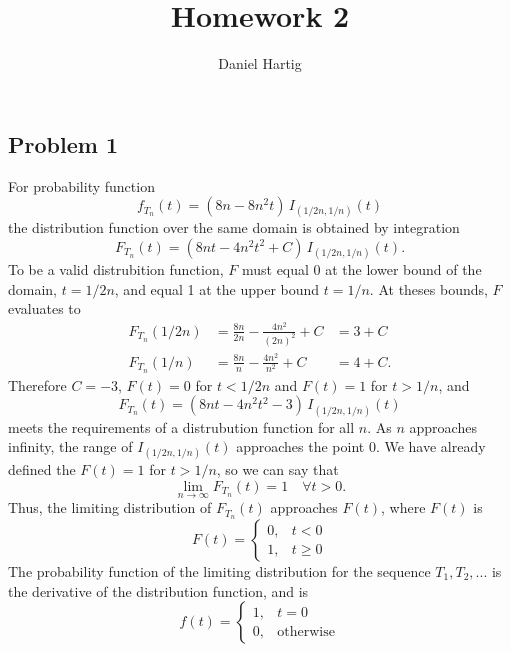 \documentclass{article}
\title{Homework 2}
\author{Daniel Hartig}
\begin{document}
\maketitle

\subsection*{Problem 1}

For probability function $$f_{T_n}(t) = (8n-8n^2t)\, I_{(1/2n, 1/n)}(t)$$ the distribution function over the same domain is obtained by integration $$F_{T_n}(t) = (8nt - 4n^2t^2 + C)\, I_{(1/2n, 1/n)}(t).$$ To be a valid distrubition function, $F$ must equal 0 at the lower bound of the domain, $t = 1/2n$, and equal 1 at the upper bound $t = 1/n$. At theses bounds, $F$ evaluates to 
\[\begin{aligned}
F_{T_n}(1/2n) &= \frac{8n}{2n} - \frac{4n^2}{(2n)^2} + C &= 3 + C \\
F_{T_n}(1/n)&= \frac{8n}{n} - \frac{4n^2}{n^2} + C &= 4 + C.
\end{aligned}\]
Therefore $C = -3$, $F(t) = 0$ for $ t<1/2n$ and $F(t) = 1$ for $ t > 1/n$, and \[F_{T_n}(t) = (8nt - 4n^2t^2 -3)\, I_{(1/2n, 1/n)}(t)\] meets the requirements of a distrubution function for all $n$. As $n$ approaches infinity, the range of $I_{(1/2n, 1/n)}(t)$ approaches the point $0$. We have already defined the $F(t) = 1$ for $ t > 1/n$, so we can say that \[\lim_{n\to\infty} F_{T_n}(t) = 1\quad \forall t > 0.\] Thus, the limiting distribution of $F_{T_n}(t)$ approaches $F(t)$, where $F(t)$ is 
\[F(t) = \begin{cases}
0, &t < 0 \\
1, &t \geq 0 \end{cases}\] The probability function of the limiting distribution for the sequence $T_1, T_2, ...$ is the derivative of the distribution function, and is 
\[f(t) = \begin{cases}
1, &t = 0 \\
0, &\text{otherwise}
\end{cases}\]

\iffalse
As $n\to\infty$, the mass function \[f_{T_n}(t) = (8n-8n^2t)\, I_{(1/2n, 1/n)}(t)\] approaches different values in its upper and lower bounds in $t$. At $t = 1/n$, \[\lim_{n\to\infty} (8n-8n^2t) = \lim_{n\to\infty} 8n-\frac{8n^2}{n} = 0.\] while at $t=1/2n$, \[\lim_{n\to\infty} (8n-8n^2t) = \lim_{n\to\infty} 8n-\frac{8n^2}{2n} = \lim_{n\to\infty} 4n = \infty.\] Meanwhile the domain of $t$ becomes $(1/2n, 1/n) = (0, 0)$. Thus the limiting distribution for $f_{T_n}$ is a vertical line at $t=0$, where the image of $f_{T_n}$ is all non-negative real numbers. 
\fi
\end{document}
